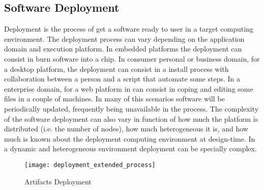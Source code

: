 \subsection{Software Deployment}

Deployment is the process of get a software ready to user in a target computing environment. The deployment process can vary depending on the application domain and execution platform. In embedded platforms the deployment can consist in burn software into a chip. In consumer personal or business domain, for a desktop platform, the deployment can consist in a install process with collaboration between a person and a script that automate some steps.
In a enterprise domain, for a web platform in can consist in coping and editing some files in a couple of machines. In many of this scenarios software will be periodically updated, frequently being unavailable in the process.
The complexity of the software deployment can also vary in function of how much the platform is distributed (i.e. the number of nodes), how much heterogeneous it is, and how much is known about the deployment computing environment at design-time. In a dynamic and heterogeneous environment deployment can be specially complex.

\label{sub:deployment}
\begin{figure}[!htb]
  \centering
  \texttt{[image: deployment\_extended\_process]}
  \caption{Artifacts Deployment}
  \label{fig:deployment_extended_process}
\end{figure}

